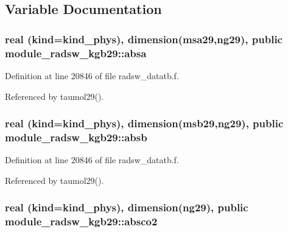 \subsection{Variable Documentation}
\subsubsection[{\texorpdfstring{absa}{absa}}]{\setlength{\rightskip}{0pt plus 5cm}real (kind=kind\+\_\+phys), dimension({\bf msa29},ng29), public module\+\_\+radsw\+\_\+kgb29\+::absa}\hypertarget{namespacemodule__radsw__kgb29_a1132fd19edc0312f6bcc905619f3bdfd}{}\label{namespacemodule__radsw__kgb29_a1132fd19edc0312f6bcc905619f3bdfd}


Definition at line 20846 of file radsw\+\_\+datatb.\+f.



Referenced by taumol29().

\subsubsection[{\texorpdfstring{absb}{absb}}]{\setlength{\rightskip}{0pt plus 5cm}real (kind=kind\+\_\+phys), dimension({\bf msb29},ng29), public module\+\_\+radsw\+\_\+kgb29\+::absb}\hypertarget{namespacemodule__radsw__kgb29_ac9fb794bc4e4a02964b5e5d1431c31c3}{}\label{namespacemodule__radsw__kgb29_ac9fb794bc4e4a02964b5e5d1431c31c3}


Definition at line 20846 of file radsw\+\_\+datatb.\+f.



Referenced by taumol29().

\subsubsection[{\texorpdfstring{absco2}{absco2}}]{\setlength{\rightskip}{0pt plus 5cm}real (kind=kind\+\_\+phys), dimension(ng29), public module\+\_\+radsw\+\_\+kgb29\+::absco2}\hypertarget{namespacemodule__radsw__kgb29_aa9a57e32dfbb8979478aa8c931ff0e2d}{}\label{namespacemodule__radsw__kgb29_aa9a57e32dfbb8979478aa8c931ff0e2d}


